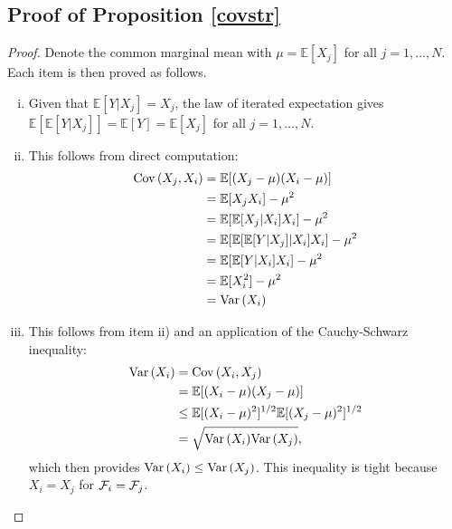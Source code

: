 \documentclass[11pt]{article}
\newcommand{\E}{\mathbb{E}}
\theoremstyle{definition}
\theoremstyle{definition}
\def\F{{\cal F}}
\def\E{{\mathbb E}}
\def\Var{{\rm Var}\,}
\def\Cov{{\rm Cov}\,}
\begin{document}
\subsection{Proof of Proposition \ref{covstr}}

\begin{proof} 
Denote the common marginal mean with $\mu = \E[X_j]$ for all $j = 1, \dots, N$. Each item is then proved as follows.
\begin{enumerate}[i)]
\item Given that $\E[Y | X_j]  = X_j$, the law of iterated expectation gives $\E[\E[Y | X_j]]  = \E[Y] = \E[X_j]$ for all $j = 1, \dots, N$. 
\item This follows from direct computation:
\begin{align*}
\Cov(X_j, X_i) &= \E[(X_j - \mu)(X_i - \mu)]\\
&= \E[X_jX_i] - \mu^2\\
&= \E[\E[X_j|X_i]X_i] - \mu^2\\
&= \E[\E[\E[Y|X_j]|X_i]X_i] - \mu^2\\
&= \E[\E[Y|X_i]X_i] - \mu^2\\
&= \E[X_i^2] - \mu^2\\
&= \Var(X_i)
\end{align*}
\item This follows from item ii) and an application of the Cauchy-Schwarz inequality:
\begin{align*}
\Var(X_i) &= \Cov(X_i, X_j)\\
&= \E[(X_i - \mu)(X_j - \mu)]\\
&\leq \E[(X_i - \mu)^2]^{1/2}\E[(X_j - \mu)^2]^{1/2}\\
&= \sqrt{\Var(X_i) \Var(X_j)},
\end{align*}
which then provides $\Var(X_i) \leq \Var(X_j)$. This inequality is tight because $X_i = X_j$ for $\F_i = \F_j$. 

\end{enumerate}
\end{proof}
\end{document}
